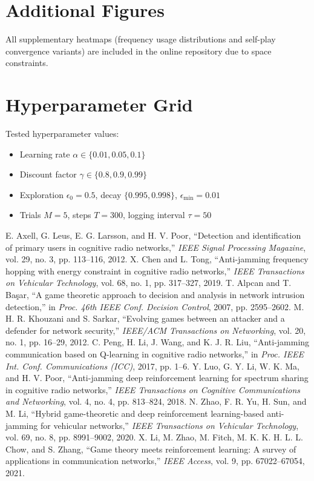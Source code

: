 \documentclass[conference]{IEEEtran}
\begin{document}
\section{Additional Figures}
All supplementary heatmaps (frequency usage distributions and self-play convergence variants) are included in the online repository due to space constraints.

\section{Hyperparameter Grid}
Tested hyperparameter values:
\begin{itemize}
  \item Learning rate $\alpha \in \{0.01,0.05,0.1\}$
  \item Discount factor $\gamma \in \{0.8,0.9,0.99\}$
  \item Exploration $\epsilon_{0}=0.5$, decay $\{0.995,0.998\}$, $\epsilon_{\min}=0.01$
  \item Trials $M=5$, steps $T=300$, logging interval $\tau=50$
\end{itemize}

\begin{thebibliography}{1}
 E. Axell, G. Leus, E. G. Larsson, and H. V. Poor, ``Detection and identification of primary users in cognitive radio networks,'' \emph{IEEE Signal Processing Magazine}, vol. 29, no. 3, pp. 113--116, 2012.
 X. Chen and L. Tong, ``Anti-jamming frequency hopping with energy constraint in cognitive radio networks,'' \emph{IEEE Transactions on Vehicular Technology}, vol. 68, no. 1, pp. 317--327, 2019.
 T. Alpcan and T. Ba\c{s}ar, ``A game theoretic approach to decision and analysis in network intrusion detection,'' in \emph{Proc. 46th IEEE Conf. Decision Control}, 2007, pp. 2595--2602.
 M. H. R. Khouzani and S. Sarkar, ``Evolving games between an attacker and a defender for network security,'' \emph{IEEE/ACM Transactions on Networking}, vol. 20, no. 1, pp. 16--29, 2012.
 C. Peng, H. Li, J. Wang, and K. J. R. Liu, ``Anti-jamming communication based on Q-learning in cognitive radio networks,'' in \emph{Proc. IEEE Int. Conf. Communications (ICC)}, 2017, pp. 1--6.
 Y. Luo, G. Y. Li, W. K. Ma, and H. V. Poor, ``Anti-jamming deep reinforcement learning for spectrum sharing in cognitive radio networks,'' \emph{IEEE Transactions on Cognitive Communications and Networking}, vol. 4, no. 4, pp. 813--824, 2018.
 N. Zhao, F. R. Yu, H. Sun, and M. Li, ``Hybrid game-theoretic and deep reinforcement learning-based anti-jamming for vehicular networks,'' \emph{IEEE Transactions on Vehicular Technology}, vol. 69, no. 8, pp. 8991--9002, 2020.
 X. Li, M. Zhao, M. Fitch, M. K. K. H. L. L. Chow, and S. Zhang, ``Game theory meets reinforcement learning: A survey of applications in communication networks,'' \emph{IEEE Access}, vol. 9, pp. 67022--67054, 2021.
\end{thebibliography}
\end{document}
